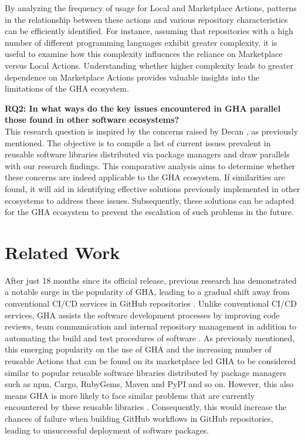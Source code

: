 \documentclass[conference]{IEEEtran}
\begin{document}
    By analyzing the frequency of usage for Local and Marketplace Actions, patterns in the relationship between these actions and various repository characteristics can be efficiently identified. For instance, assuming that repositories with a high number of different programming languages exhibit greater complexity, it is useful to examine how this complexity influences the reliance on Marketplace versus Local Actions. Understanding whether higher complexity leads to greater dependence on Marketplace Actions provides valuable insights into the limitations of the GHA ecosystem. 

 \textbf{RQ2: In what ways do the key issues encountered in GHA parallel those found in other software ecosystems?}\\

    This research question is inspired by the concerns raised by Decan \cite{decan2022use}, as previously mentioned. The objective is to compile a list of current issues prevalent in reusable software libraries distributed via package managers and draw parallels with our research findings. This comparative analysis aims to determine whether these concerns are indeed applicable to the GHA ecosystem. If similarities are found, it will aid in identifying effective solutions previously implemented in other ecosystems to address these issues. Subsequently, these solutions can be adapted for the GHA ecosystem to prevent the escalation of such problems in the future.




\section{Related Work}
 	After just 18 months since its official release, previous research has demonstrated a notable surge in the popularity of GHA, leading to a gradual shift away from conventional CI/CD services in GitHub repositories \cite{golzadeh2021rise}. Unlike conventional CI/CD services, GHA assists the software development processes by improving code reviews, team communication and internal repository management in addition to automating the build and test procedures of software \cite{chandrasekara2021hands}. As previously mentioned, this emerging popularity on the use of GHA and the increasing number of reusable Actions that can be found on its marketplace led GHA to be considered similar to popular reusable software libraries distributed by package managers such as npm, Cargo, RubyGems, Maven and PyPI and so on. However, this also means GHA is more likely to face similar problems that are currently encountered by these reusable libraries \cite{decan2022use}. Consequently, this would increase the chances of failure when building GitHub workflows in GitHub repositories, leading to unsuccessful deployment of software packages.
\end{document}
